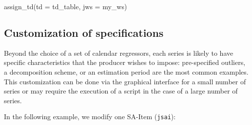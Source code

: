 \documentclass[
  letterpaper,
  DIV=11,
  numbers=noendperiod]{scrreprt}
\newenvironment{Shaded}{\begin{snugshade}}{\end{snugshade}}
\newcommand{\AttributeTok}[1]{\textcolor[rgb]{0.40,0.45,0.13}{#1}}
\newcommand{\FunctionTok}[1]{\textcolor[rgb]{0.28,0.35,0.67}{#1}}
\newcommand{\NormalTok}[1]{\textcolor[rgb]{0.00,0.23,0.31}{#1}}
\begin{document}
\begin{Shaded}
\begin{Highlighting}[]
\FunctionTok{assign\_td}\NormalTok{(}\AttributeTok{td =}\NormalTok{ td\_table, }\AttributeTok{jws =}\NormalTok{ my\_ws)}
\end{Highlighting}
\end{Shaded}

\hypertarget{customization-of-specifications}{%
\subsection*{Customization of
specifications}\label{customization-of-specifications}}

Beyond the choice of a set of calendar regressors, each series is likely
to have specific characteristics that the producer wishes to impose:
pre-specified outliers, a decomposition scheme, or an estimation period
are the most common examples. This customization can be done via the
graphical interface for a small number of series or may require the
execution of a script in the case of a large number of series.

In the following example, we modify one SA-Item (\texttt{jsai}):
\end{document}
